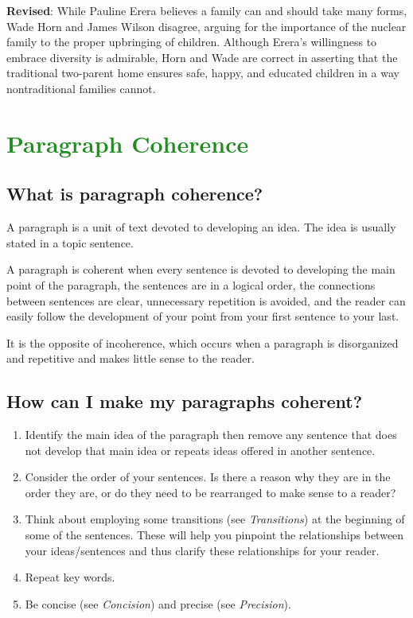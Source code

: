 \documentclass[12pt, hidelinks]{article} %
\begin{document}
\textbf{Revised}: While Pauline Erera believes a family can and should take many forms, Wade Horn and James Wilson disagree, arguing for the importance of the nuclear family to the proper upbringing of children. Although Erera's willingness to embrace diversity is admirable, Horn and Wade are correct in asserting that the traditional two-parent home ensures safe, happy, and educated children in a way nontraditional families cannot.


\section{\textcolor{ForestGreen}{Paragraph Coherence}}

\subsection{What is paragraph coherence?}

A paragraph is a unit of text devoted to developing an idea. The idea is usually stated in a topic sentence.

A paragraph is coherent when every sentence is devoted to developing the main point of the paragraph, the sentences are in a logical order, the connections between sentences are clear, unnecessary repetition is avoided, and the reader can easily follow the development of your point from your first sentence to your last.

It is the opposite of incoherence, which occurs when a paragraph is disorganized and repetitive and makes little sense to the reader.

\subsection{How can I make my paragraphs coherent?}

\begin{enumerate}

\item Identify the main idea of the paragraph then remove any sentence that does not develop that main idea or repeats ideas offered in another sentence.

\item Consider the order of your sentences. Is there a reason why they are in the order they are, or do they need to be rearranged to make sense to a reader?

\item Think about employing some transitions (see \emph{Transitions}) at the beginning of some of the sentences. These will help you pinpoint the relationships between your ideas/sentences and thus clarify these relationships for your reader.

\item Repeat key words.

\item Be concise (see \emph {Concision}) and precise (see \emph{Precision}).
\end{enumerate}
 
\end{document}

